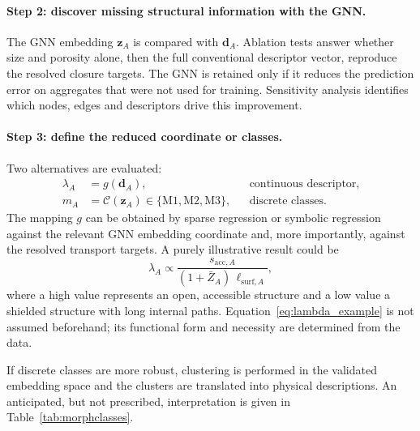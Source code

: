 \documentclass[11pt,a4paper]{article}
\begin{document}
\paragraph{Step 2: discover missing structural information with the GNN.}
The GNN embedding \(\boldsymbol{z}_A\) is compared with
\(\boldsymbol{d}_A\). Ablation tests answer whether size and porosity alone,
then the full conventional descriptor vector, reproduce the resolved closure
targets. The GNN is retained only if it reduces the prediction error on
aggregates that were not used for training. Sensitivity analysis identifies
which nodes, edges and descriptors drive this improvement.

\paragraph{Step 3: define the reduced coordinate or classes.}
Two alternatives are evaluated:
\begin{align}
  \lambda_A &=g(\boldsymbol{d}_A),
  &&\text{continuous descriptor}, \label{eq:lambda_continuous}\\
  m_A &=\mathcal{C}(\boldsymbol{z}_A)
  \in\{\mathrm{M1},\mathrm{M2},\mathrm{M3}\},
  &&\text{discrete classes}. \label{eq:lambda_classes}
\end{align}
The mapping \(g\) can be obtained by sparse regression or symbolic regression
against the relevant GNN embedding coordinate and, more importantly, against
the resolved transport targets. A purely illustrative result could be
\begin{equation}
  \lambda_A
  \propto
  \frac{s_{\mathrm{acc},A}}
  {(1+\bar Z_A)\,\ell_{\mathrm{surf},A}},
  \label{eq:lambda_example}
\end{equation}
where a high value represents an open, accessible structure and a low value a
shielded structure with long internal paths. Equation~\eqref{eq:lambda_example}
is not assumed beforehand; its functional form and necessity are determined
from the data.

If discrete classes are more robust, clustering is performed in the validated
embedding space and the clusters are translated into physical descriptions.
An anticipated, but not prescribed, interpretation is given in
Table~\ref{tab:morphclasses}.
\end{document}
